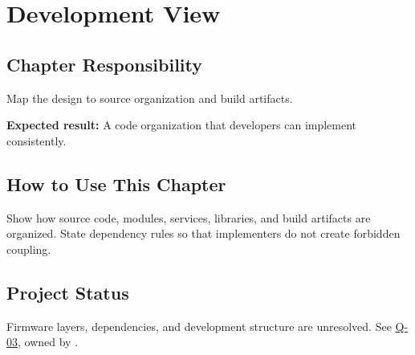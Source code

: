 \chapter{Development View}
\section{Chapter Responsibility}
\label{Section:DevelopmentViewResponsibility}
Map the design to source organization and build artifacts.

\noindent\textbf{Expected result:} A code organization that developers can implement consistently.

\section{How to Use This Chapter}
Show how source code, modules, services, libraries, and build artifacts are organized. State dependency rules so that implementers do not create forbidden coupling.

\section{Project Status}
Firmware layers, dependencies, and development structure are unresolved.
See \hyperref[Question:Q-03]{Q-03}, owned by \DocumentOwner.
